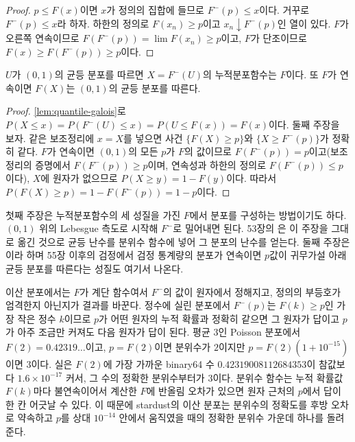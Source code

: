 \begin{proof}
$p\le F(x)$이면 $x$가 정의의 집합에 들므로 $F^{-}(p)\le x$이다. 거꾸로 $F^{-}(p)\le x$라 하자. 하한의 정의로 $F(x_n)\ge p$이고 $x_n\downarrow F^{-}(p)$인 열이 있다. $F$가 오른쪽 연속이므로 $F(F^{-}(p))=\lim F(x_n)\ge p$이고, $F$가 단조이므로 $F(x)\ge F(F^{-}(p))\ge p$이다.
\end{proof}

\begin{theorem}[역변환]
\label{thm:inverse-transform}
$U$가 $(0,1)$의 균등 분포를 따르면 $X=F^{-}(U)$의 누적분포함수는 $F$이다. 또 $F$가 연속이면 $F(X)$는 $(0,1)$의 균등 분포를 따른다.
\end{theorem}

\begin{proof}
\cref{lem:quantile-galois}로 $P(X\le x)=P(F^{-}(U)\le x)=P(U\le F(x))=F(x)$이다. 둘째 주장을 보자. 같은 보조정리에 $x=X$를 넣으면 사건 $\{F(X)\ge p\}$와 $\{X\ge F^{-}(p)\}$가 정확히 같다. $F$가 연속이면 $(0,1)$의 모든 $p$가 $F$의 값이므로 $F(F^{-}(p))=p$이고(보조정리의 증명에서 $F(F^{-}(p))\ge p$이며, 연속성과 하한의 정의로 $F(F^{-}(p))\le p$이다), $X$에 원자가 없으므로 $P(X\ge y)=1-F(y)$이다. 따라서 $P(F(X)\ge p)=1-F(F^{-}(p))=1-p$이다.
\end{proof}

첫째 주장은 누적분포함수의 세 성질을 가진 $F$에서 분포를 구성하는 방법이기도 하다. $(0,1)$ 위의 Lebesgue 측도로 시작해 $F^{-}$로 밀어내면 된다. 53장의 은 이 주장을 그대로 옮긴 것으로 균등 난수를 분위수 함수에 넣어 그 분포의 난수를 얻는다. 둘째 주장은 이라 하며 55장 이후의 검정에서 검정 통계량의 분포가 연속이면 $p$값이 귀무가설 아래 균등 분포를 따른다는 성질도 여기서 나온다.

이산 분포에서는 $F$가 계단 함수여서 $F^{-}$의 값이 원자에서 정해지고, 정의의 부등호가 엄격한지 아닌지가 결과를 바꾼다. 정수에 실린 분포에서 $F^{-}(p)$는 $F(k)\ge p$인 가장 작은 정수 $k$이므로 $p$가 어떤 원자의 누적 확률과 정확히 같으면 그 원자가 답이고 $p$가 아주 조금만 커져도 다음 원자가 답이 된다. 평균 $3$인 Poisson 분포에서 $F(2)=0.42319\ldots$이고, $p=F(2)$이면 분위수가 $2$이지만 $p=F(2)(1+10^{-15})$이면 $3$이다. 실은 $F(2)$에 가장 가까운 binary64 수 $0.42319008112684353$이 참값보다 $1.6\times10^{-17}$ 커서, 그 수의 정확한 분위수부터가 $3$이다. 분위수 함수는 누적 확률값 $F(k)$마다 불연속이어서 계산한 $F$에 반올림 오차가 있으면 원자 근처의 $p$에서 답이 한 칸 어긋날 수 있다. 이 때문에 stardust의 이산 분포는 분위수의 정확도를 후방 오차로 약속하고 $p$를 상대 $10^{-14}$ 안에서 움직였을 때의 정확한 분위수 가운데 하나를 돌려준다.

